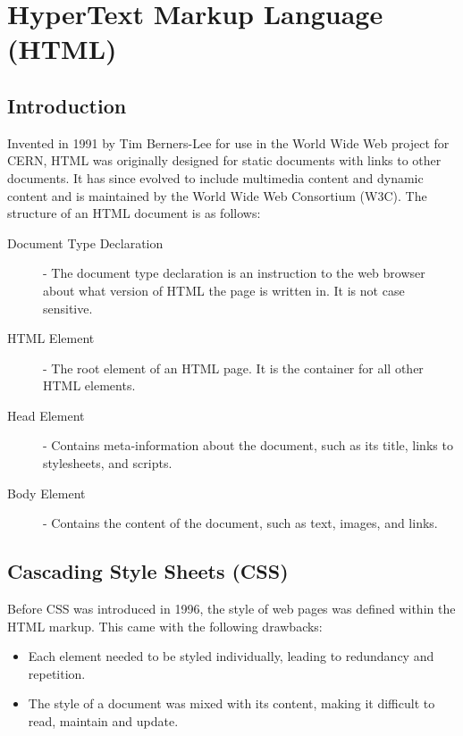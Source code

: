\documentclass[12pt letter]{report}
\begin{document}
\chapter{HyperText Markup Language (HTML)}

\section{Introduction}


Invented in 1991 by Tim Berners-Lee for use in the World Wide Web project for CERN, HTML was originally designed for
static documents with links to other documents. It has since evolved to include multimedia content and dynamic content
and is maintained by the World Wide Web Consortium (W3C). The structure of an HTML document is as follows:
\begin{description}
  \item[Document Type Declaration]  - The document type declaration is an instruction to the web browser about what version of HTML the page is written in. It is not case sensitive.
  \item[HTML Element] - The root element of an HTML page. It is the container for all other HTML elements.
  \item[Head Element] - Contains meta-information about the document, such as its title, links to stylesheets, and scripts.
  \item[Body Element] - Contains the content of the document, such as text, images, and links.
\end{description}


\section{Cascading Style Sheets (CSS)}


Before CSS was introduced in 1996, the style of web pages was defined within the HTML markup. This came with the
following drawbacks:
\begin{itemize}
  \item Each element needed to be styled individually, leading to redundancy and repetition.
  \item The style of a document was mixed with its content, making it difficult to read, maintain and update.
\end{itemize}
\end{document}
